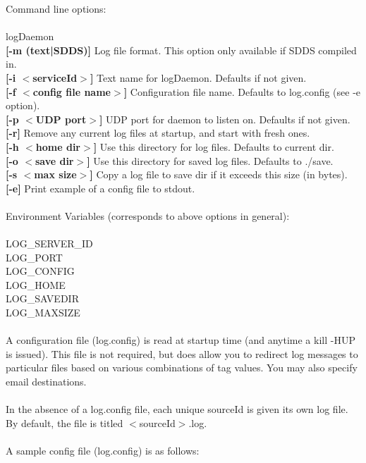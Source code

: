 \documentclass[11pt]{article}
\begin{document}
Command line options:\\
\\
logDaemon\\
{\bf [-m (text|SDDS)]} Log file format. This  option only available if SDDS compiled
in.\\
{\bf [-i $<$serviceId$>$]} Text name for logDaemon. Defaults if not given.\\
{\bf [-f $<$config file name$>$]} Configuration file  name. Defaults to log.config (see -e
option).\\
{\bf [-p $<$UDP port$>$]} UDP port for daemon to listen on. Defaults if not given.\\
{\bf [-r]} Remove any current log files at startup, and start with fresh ones.\\
{\bf [-h $<$home dir$>$]} Use this directory for log files. Defaults to current dir.\\
{\bf [-o $<$save dir$>$]} Use this directory for saved log files. Defaults to ./save.\\
{\bf [-s $<$max size$>$]} Copy a log file to save dir if it exceeds this size (in bytes).\\
{\bf [-e]} Print example of a config file to stdout.\\
\\
Environment Variables (corresponds to above options in general):\\
\\
LOG\_SERVER\_ID\\
LOG\_PORT\\
LOG\_CONFIG\\
LOG\_HOME\\
LOG\_SAVEDIR\\
LOG\_MAXSIZE\\
\\
A configuration file (log.config) is read at startup time (and anytime a kill -HUP is issued). This file is not required, but does allow you to redirect log messages to particular files based on various combinations of tag values. You may also specify email destinations.\\
\\
In the absence of a log.config file, each unique sourceId is given its own log file. By default, the file is titled $<$sourceId$>$.log.\\
\\
A sample config file (log.config) is as follows:
\end{document}
